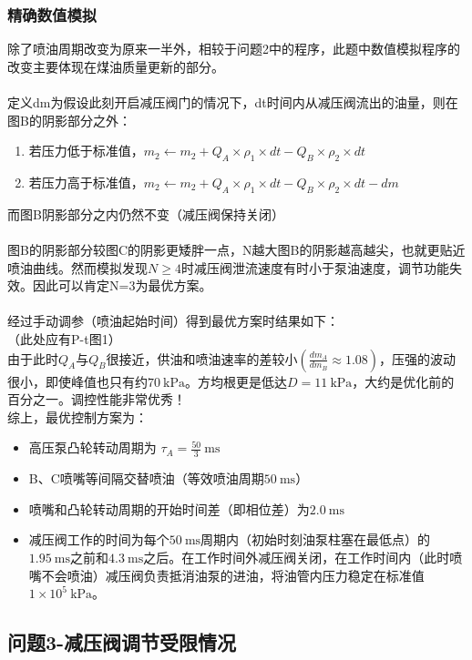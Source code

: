 \documentclass{article}
\newcommand{\prb}{\times 10^5~\mathrm{kPa}}
\newcommand{\pre}{~\mathrm{kPa}}
\newcommand{\tim}{~\mathrm{ms}}
\begin{document}
	\subsubsection{精确数值模拟}
		除了喷油周期改变为原来一半外，相较于问题2中的程序，此题中数值模拟程序的改变主要体现在煤油质量更新的部分。\\\\
		定义dm为假设此刻开启减压阀门的情况下，dt时间内从减压阀流出的油量，则在图B的阴影部分之外：
		\begin{enumerate}
		\item 
		若压力低于标准值，$m_2 \leftarrow m_2 + Q_A \times \rho_1 \times dt - Q_B \times \rho_2 \times dt$
		\item 
		若压力高于标准值，$m_2 \leftarrow m_2 + Q_A \times \rho_1 \times dt - Q_B \times \rho_2 \times dt - dm$
		\end{enumerate}
		而图B阴影部分之内仍然不变（减压阀保持关闭）\\\\
		图B的阴影部分较图C的阴影更矮胖一点，N越大图B的阴影越高越尖，也就更贴近喷油曲线。然而模拟发现$N\ge 4$时减压阀泄流速度有时小于泵油速度，调节功能失效。因此可以肯定N=3为最优方案。\\\\
		经过手动调参（喷油起始时间）得到最优方案时结果如下：\\
		
		（此处应有P-t图1）\\
		
		由于此时$Q_A$与$Q_B$很接近，供油和喷油速率的差较小$(\frac{dm_A}{dm_B}\approx1.08)$，压强的波动很小，即使峰值也只有约$70\pre$。方均根更是低达$D=11\pre$，大约是优化前的百分之一。调控性能非常优秀！\\
		
		综上，最优控制方案为：
		\begin{itemize}
			\item 高压泵凸轮转动周期为 $\tau_A=\frac{50}{3}\tim$
			\item B、C喷嘴等间隔交替喷油（等效喷油周期$50\tim$）
			\item 喷嘴和凸轮转动周期的开始时间差（即相位差）为$2.0\tim$
			\item 
			减压阀工作的时间为每个$50\tim$周期内（初始时刻油泵柱塞在最低点）的$1.95\tim$之前和$4.3\tim$之后。在工作时间外减压阀关闭，在工作时间内（此时喷嘴不会喷油）减压阀负责抵消油泵的进油，将油管内压力稳定在标准值$1\prb$。
		\end{itemize}
	
	\subsection{问题3-减压阀调节受限情况}
\end{document}
